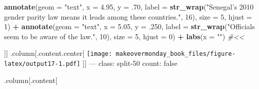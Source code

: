 \documentclass[]{book}
\newenvironment{Shaded}{\begin{snugshade}}{\end{snugshade}}
\newcommand{\KeywordTok}[1]{\textcolor[rgb]{0.13,0.29,0.53}{\textbf{#1}}}
\newcommand{\DataTypeTok}[1]{\textcolor[rgb]{0.13,0.29,0.53}{#1}}
\newcommand{\DecValTok}[1]{\textcolor[rgb]{0.00,0.00,0.81}{#1}}
\newcommand{\FloatTok}[1]{\textcolor[rgb]{0.00,0.00,0.81}{#1}}
\newcommand{\StringTok}[1]{\textcolor[rgb]{0.31,0.60,0.02}{#1}}
\newcommand{\CommentTok}[1]{\textcolor[rgb]{0.56,0.35,0.01}{\textit{#1}}}
\newcommand{\OperatorTok}[1]{\textcolor[rgb]{0.81,0.36,0.00}{\textbf{#1}}}
\newcommand{\NormalTok}[1]{#1}
\theoremstyle{definition}
\theoremstyle{definition}
\theoremstyle{definition}
\theoremstyle{remark}
\begin{document}
\begin{Shaded}
\begin{Highlighting}[]
\StringTok{  }\KeywordTok{annotate}\NormalTok{(}\DataTypeTok{geom =} \StringTok{"text"}\NormalTok{, }\DataTypeTok{x =} \FloatTok{4.95}\NormalTok{, }\DataTypeTok{y =}\NormalTok{ .}\DecValTok{70}\NormalTok{, }\DataTypeTok{label =} \KeywordTok{str_wrap}\NormalTok{(}\StringTok{"Senegal's 2010 gender parity law means it leads among these countries."}\NormalTok{, }\DecValTok{16}\NormalTok{), }\DataTypeTok{size =} \DecValTok{5}\NormalTok{, }\DataTypeTok{hjust =} \DecValTok{1}\NormalTok{) }\OperatorTok{+}
\StringTok{  }\KeywordTok{annotate}\NormalTok{(}\DataTypeTok{geom =} \StringTok{"text"}\NormalTok{, }\DataTypeTok{x =} \FloatTok{5.05}\NormalTok{, }\DataTypeTok{y =}\NormalTok{ .}\DecValTok{250}\NormalTok{, }\DataTypeTok{label =} \KeywordTok{str_wrap}\NormalTok{(}\StringTok{"Officials seem to be aware of the law."}\NormalTok{, }\DecValTok{10}\NormalTok{), }\DataTypeTok{size =} \DecValTok{5}\NormalTok{, }\DataTypeTok{hjust =} \DecValTok{0}\NormalTok{) }\OperatorTok{+}
\StringTok{  }\KeywordTok{labs}\NormalTok{(}\DataTypeTok{x =} \StringTok{""}\NormalTok{)  }\CommentTok{#<<}
\end{Highlighting}
\end{Shaded}

{]}{]} .column{[}.content.center{[}
\texttt{[image: makeovermonday\_book\_files/figure-latex/output17-1.pdf]}
{]}{]} --- class: split-50 count: false

.column{[}.content{[}
\end{document}
